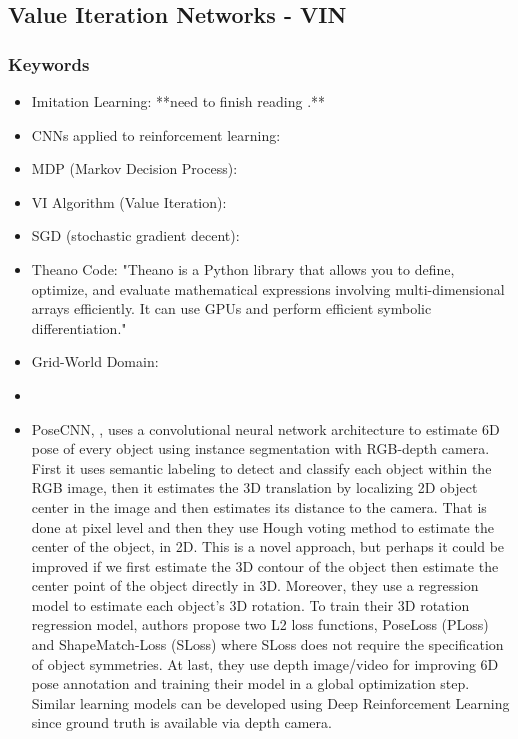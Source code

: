 \documentclass[11pt]{article}
\begin{document}
\subsection{Value Iteration Networks - VIN \cite{VIN}}
\subsubsection{Keywords}
\begin{itemize}
	\item Imitation Learning: **need to finish reading \cite{Vitaly_Kurin_2017}.**

	\item CNNs applied to reinforcement learning:

	\item MDP (Markov Decision Process):

	\item VI Algorithm (Value Iteration):

	\item SGD (stochastic gradient decent):

	\item Theano Code: "Theano is a Python library that allows you to define, optimize, and evaluate mathematical expressions involving multi-dimensional arrays efficiently. It can use GPUs and perform efficient symbolic differentiation."

	\item Grid-World Domain:
	\item
	\item PoseCNN, \cite{PoseCNN}, uses a convolutional neural network architecture to estimate 6D pose of every object using instance segmentation with RGB-depth camera. First it uses semantic labeling to detect and classify each object within the RGB image, then it estimates the 3D translation by localizing 2D object center in the image and then estimates its distance to the camera. That is done at pixel level and then they use Hough voting method to estimate the center of the object, in 2D. This is a novel approach, but perhaps it could be improved if we first estimate the 3D contour of the object then estimate the center point of the object directly in 3D. Moreover, they use a regression model to estimate each object's 3D rotation. To train their 3D rotation regression model, authors propose two L2 loss functions, PoseLoss (PLoss) and ShapeMatch-Loss (SLoss) where SLoss does not require the specification of object symmetries. At last, they use depth image/video for improving 6D pose annotation and training their model in a global optimization step. Similar learning models can be developed using Deep Reinforcement Learning since ground truth is available via depth camera.

\end{itemize}

\newpage


\end{document}
